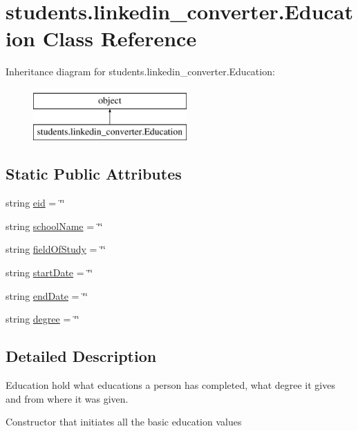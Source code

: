 \hypertarget{classstudents_1_1linkedin__converter_1_1_education}{\section{students.\-linkedin\-\_\-converter.\-Education Class Reference}
\label{classstudents_1_1linkedin__converter_1_1_education}
}
Inheritance diagram for students.\-linkedin\-\_\-converter.\-Education\-:\begin{figure}[H]
\begin{center}
\leavevmode
\includegraphics[height=2.000000cm]{classstudents_1_1linkedin__converter_1_1_education}
\end{center}
\end{figure}
\subsection*{Static Public Attributes}
\begin{DoxyCompactItemize}
\item 
string \hyperlink{classstudents_1_1linkedin__converter_1_1_education_a6063bcfc937fd2bff573e9afbbcf3397}{eid} = \char`\"{}\char`\"{}
\item 
string \hyperlink{classstudents_1_1linkedin__converter_1_1_education_afbce23ee5c2c52b61bfa11c8939b4765}{school\-Name} = \char`\"{}\char`\"{}
\item 
string \hyperlink{classstudents_1_1linkedin__converter_1_1_education_ac1ea0d7760168e3bcf6a22cbc77b3009}{field\-Of\-Study} = \char`\"{}\char`\"{}
\item 
string \hyperlink{classstudents_1_1linkedin__converter_1_1_education_ac9f024efe815cfcd3909023f5104a21c}{start\-Date} = \char`\"{}\char`\"{}
\item 
string \hyperlink{classstudents_1_1linkedin__converter_1_1_education_af8ff3553515ad802d83119ec41244172}{end\-Date} = \char`\"{}\char`\"{}
\item 
string \hyperlink{classstudents_1_1linkedin__converter_1_1_education_a95e740f34b15f9f118e5b33d5058bd08}{degree} = \char`\"{}\char`\"{}
\end{DoxyCompactItemize}


\subsection{Detailed Description}
\begin{DoxyVerb}Education hold what educations a person has completed, what degree it
gives and from where it was given.\end{DoxyVerb}
\begin{DoxyVerb}Constructor that initiates all the basic education values\end{DoxyVerb}
 

